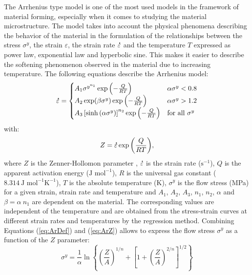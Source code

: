 \documentclass[metals,article,submit,pdftex,moreauthors]{Definitions/mdpi}
\DeclareRobustCommand{\mdot}[1]{\accentset{\mbox{\bfseries .}}{#1}}
\DeclareRobustCommand{\ps}{\text{s}^{-1}}
\begin{document}
The Arrhenius type model \cite{Sellars-1966} is one of the most used models in the framework of material forming, especially when it comes to studying the material microstructure.
The model takes into account the physical phenomena describing the behavior of the material in the formulation of the relationships between the stress $\sigma^y$, the strain $\varepsilon$, the strain rate $\mdot\varepsilon$ and the temperature $T$ expressed as power law, exponential law and hyperbolic sine.
This makes it easier to describe the softening phenomenon observed in the material due to increasing temperature.
The following equations describe the Arrhenius model:
\begin{equation}
\mdot\varepsilon =
\begin{cases}
A_1 \sigma^{y^{n_1}} \exp{\left(-\frac{Q}{RT}\right)} & \alpha\sigma^y < 0.8\\
A_2 \exp(\beta\sigma^y) \exp{\left(-\frac{Q}{RT}\right)} & \alpha\sigma^y > 1.2\\
A_3 \left[\sinh{\left(\alpha\sigma^y\right)}\right]^{n_2} \exp{\left(-\frac{Q}{RT}\right)} & \text{for all }\sigma^y
\end{cases}
\label{eq:ArDef}
\end{equation}
with:
\begin{equation}
Z = \mdot\varepsilon \exp{\left(\frac{Q}{RT}\right)}, \label{eq:ArZ}
\end{equation}
where $Z$ is the Zenner-Hollomon parameter \cite{Zener-1944}, $\mdot\varepsilon$ is the strain rate ($\ps$), $Q$ is the apparent activation energy ($\text{J~mol}^{-1}$), $R$ is the universal gas constant ($8.314~\text{J~mol}^{-1} \text{K}^{-1}$), $T$ is the absolute temperature (K), $\sigma^y$ is the flow stress (MPa) for a given strain, strain rate and temperature and $A_1$, $A_2$, $A_3$, $n_1$, $n_2$, $\alpha$ and $\beta=\alpha~n_1$ are dependent on the material.
The corresponding values are independent of the temperature and are obtained from the stress-strain curves at different strain rates and temperatures by the regression method.
Combining Equations (\ref{eq:ArDef}) and (\ref{eq:ArZ}) allows to express the flow stress $\sigma^y$ as a function of the $Z$ parameter:
\begin{equation}
\sigma^y = \frac{1}{\alpha} \ln\left\{\left(\frac{Z}{A}\right)^{1/n} + \left[1 + \left(\frac{Z}{A}\right)^{2/n}\right]^{1/2}\right\}
\end{equation}
\end{document}
